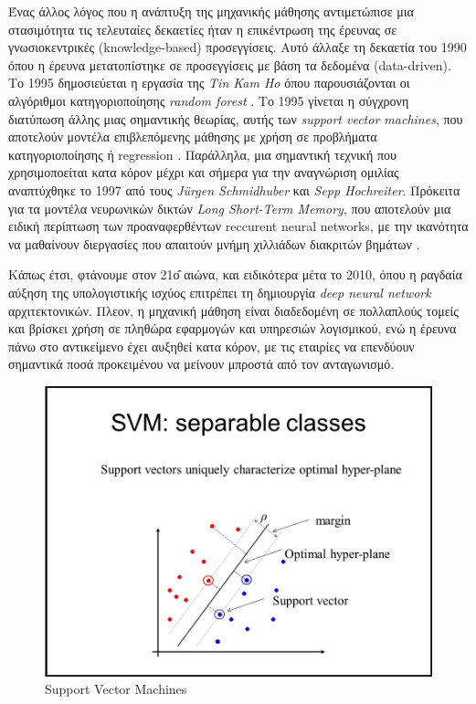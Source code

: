 \medskip
Ένας άλλος λόγος που η ανάπτυξη της μηχανικής μάθησης αντιμετώπισε μια στασιμότητα τις τελευταίες δεκαετίες ήταν η επικέντρωση της έρευνας σε γνωσιοκεντρικές (knowledge-based) προσεγγίσεις. Αυτό άλλαξε τη δεκαετία του 1990 όπου η έρευνα μετατοπίστηκε σε προσεγγίσεις με βάση τα δεδομένα (data-driven). Το 1995 δημοσιεύεται η εργασία της \textit{Tin Kam Ho} όπου παρουσιάζονται οι αλγόριθμοι κατηγοριοποίησης \textit{random forest} \cite{Ho}. Το 1995 γίνεται η σύγχρονη διατύπωση άλλης μιας σημαντικής θεωρίας, αυτής των \textit{support vector machines}, που αποτελούν μοντέλα επιβλεπόμενης μάθησης με χρήση σε προβλήματα κατηγοριοποίησης ή regression \cite{Cortes1995}. Παράλληλα, μια σημαντική τεχνική που χρησιμοποείται κατα κόρον μέχρι και σήμερα για την αναγνώριση ομιλίας αναπτύχθηκε το 1997 από τους \textit{Jürgen Schmidhuber} και \textit{Sepp Hochreiter}. Πρόκειτα για τα μοντέλα νευρωνικών δικτών \textit{Long Short-Term Memory}, που αποτελούν μια ειδική περίπτωση των προαναφερθέντων reccurent neural networks, με την ικανότητα να μαθαίνουν διεργασίες που απαιτούν μνήμη χιλλιάδων διακριτών βημάτων \cite{Hochreiter1997}.

\medskip
Κάπως έτσι, φτάνουμε στον 21\^ο αιώνα, και ειδικότερα μέτα το 2010, όπου η ραγδαία αύξηση της υπολογιστικής ισχύος επιτρέπει τη δημιουργία \textit{deep neural network} αρχιτεκτονικών. Πλεον, η μηχανική μάθηση είναι διαδεδομένη σε πολλαπλούς τομείς και βρίσκει χρήση σε πληθώρα εφαρμογών και υπηρεσιών λογισμικού, ενώ η έρευνα πάνω στο αντικείμενο έχει αυξηθεί κατα κόρον, με τις εταιρίες να επενδύουν σημαντικά ποσά προκειμένου να μείνουν μπροστά από τον ανταγωνισμό.


\begin{figure}[h]
  \centering
  \includegraphics[scale=0.5]{images/SVM.jpg}
  \caption{Support Vector Machines}
  \label{fig:Support Vector Machines}
\end{figure}


